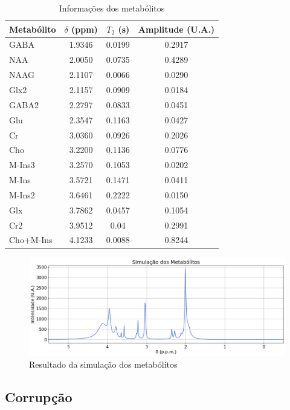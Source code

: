 \documentclass[
12pt,		
twoside, 
a4paper,
chapter=TITLE,
english,			
brazil]{USPSC-classe/USPSC}
\begin{document}
\begin{table}[H] 
    \centering
    \begin{tabular}{|l|c|c|c|}
    \hline
    Metabólito & $\delta$ (ppm) & $T_2$ (s) & Amplitude (U.A.) \\
    \hline
    GABA & 1.9346 & 0.0199 & 0.2917 \\
    NAA & 2.0050 & 0.0735 & 0.4289 \\
    NAAG & 2.1107 & 0.0066 & 0.0290 \\
    Glx2 & 2.1157 & 0.0909 & 0.0184 \\
    GABA2 & 2.2797 & 0.0833 & 0.0451 \\
    Glu & 2.3547 & 0.1163 & 0.0427 \\
    Cr & 3.0360 & 0.0926 & 0.2026 \\
    Cho & 3.2200 & 0.1136 & 0.0776 \\
    M-Ins3 & 3.2570 & 0.1053 & 0.0202 \\
    M-Ins & 3.5721 & 0.1471 & 0.0411 \\
    M-Ins2 & 3.6461 & 0.2222 & 0.0150 \\
    Glx & 3.7862 & 0.0457 & 0.1054 \\
    Cr2 & 3.9512 & 0.04 & 0.2991 \\
    Cho+M-Ins & 4.1233 & 0.0088 & 0.8244 \\
    \hline
    \end{tabular}
    \caption{Informações dos metabólitos}
    \label{table:1}
\end{table}

\begin{figure} [H]
    \includegraphics[scale=0.37]{metabolites.png}
    \centering
    \caption{Resultado da simulação dos metabólitos}
    \label{fig:4}
\end{figure}

\subsection{Corrupção}
\end{document}
